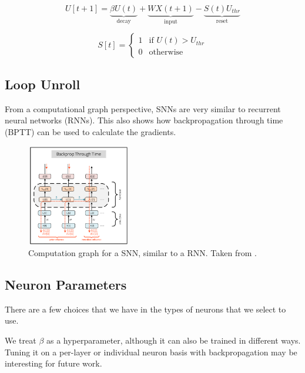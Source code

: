 \documentclass[../taasin.tex]{subfiles}
\begin{document}
$$ U[t+1] = \underbrace{\beta U(t)}_{\text{decay}}
+ \underbrace{W X(t+1)}_{\text{input}}
- \underbrace{S(t)U_{thr}}_{\text{reset}} 
$$

$$
S[t] = \begin{cases} 
      1 & \text{if } U(t) > U_{thr} \\
      0 & \text{otherwise }
      \end{cases}
$$


\subsection{Loop Unroll}

From a computational graph perspective, SNNs are very similar to recurrent neural networks (RNNs). This also shows how backpropagation through time (BPTT) can be used to calculate the gradients.

\begin{figure}[h]
    \centering
    \includegraphics[width=0.4\textwidth]{figures/snnTorch_bptt.png}
    \caption{Computation graph for a SNN, similar to a RNN. Taken from \cite{snnTorch}.}
    \label{fig:snn_loop_unroll}
\end{figure}


\subsection{Neuron Parameters}

There are a few choices that we have in the types of neurons that we select to use.

We treat $\beta$ as a hyperparameter, although it can also be trained in different ways. Tuning it on a per-layer or individual neuron basis with backpropagation may be interesting for future work.
\end{document}
